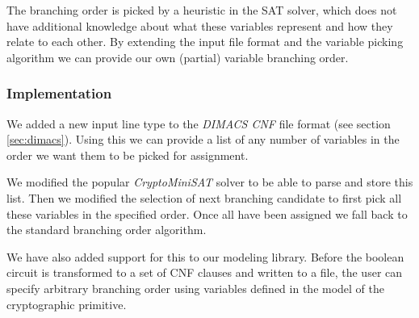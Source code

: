 The branching order is picked by a heuristic in the SAT solver, which does not have additional knowledge about what these variables represent and how they relate to each other.
By extending the input file format and the variable picking algorithm we can provide our own (partial) variable branching order.

\subsubsection{Implementation}

We added a new input line type to the \emph{DIMACS CNF} file format (see section \ref{sec:dimacs}).
Using this we can provide a list of any number of variables in the order we want them to be picked for assignment.

We modified the popular \emph{CryptoMiniSAT} solver to be able to parse and store this list.
Then we modified the selection of next branching candidate to first pick all these variables in the specified order.
Once all have been assigned we fall back to the standard branching order algorithm.

We have also added support for this to our modeling library.
Before the boolean circuit is transformed to a set of CNF clauses and written to a file, the user can specify arbitrary branching order using variables defined in the model of the cryptographic primitive.

